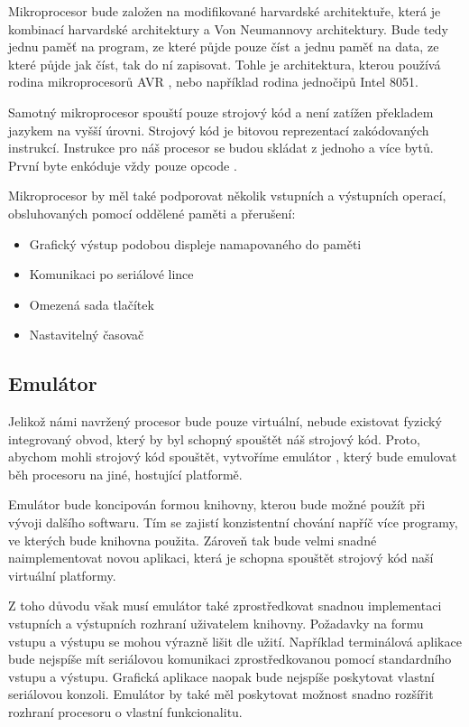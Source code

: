 Mikroprocesor bude založen na modifikované harvardské architektuře, která je kombinací harvardské architektury a Von Neumannovy architektury.  Bude tedy jednu paměť na program, ze které půjde pouze číst a jednu paměť na data, ze které půjde jak číst, tak do ní zapisovat. Tohle je architektura, kterou používá rodina mikroprocesorů AVR , nebo například rodina jednočipů Intel 8051. 

Samotný mikroprocesor spouští pouze strojový kód a není zatížen překladem jazykem na vyšší úrovni. Strojový kód je bitovou reprezentací zakódovaných instrukcí. Instrukce pro náš procesor se budou skládat z jednoho a více bytů. První byte enkóduje vždy pouze opcode . 

Mikroprocesor by měl také podporovat několik vstupních a výstupních operací, obsluhovaných pomocí oddělené paměti a přerušení:

\begin{itemize}
	\item Grafický výstup podobou displeje namapovaného do paměti
	\item Komunikaci po seriálové lince
	\item Omezená sada tlačítek
	\item Nastavitelný časovač
\end{itemize}

\subsection{Emulátor}

Jelikož námi navržený procesor bude pouze virtuální, nebude existovat fyzický integrovaný obvod, který by byl schopný spouštět náš strojový kód. Proto, abychom mohli strojový kód spouštět, vytvoříme emulátor , který bude emulovat běh procesoru na jiné, hostující platformě.

Emulátor bude koncipován formou knihovny, kterou bude možné použít při vývoji dalšího softwaru. Tím se zajistí konzistentní chování napříč více programy, ve kterých bude knihovna použita. Zároveň tak bude velmi snadné naimplementovat novou aplikaci, která je schopna spouštět strojový kód naší virtuální platformy.

Z toho důvodu však musí emulátor také zprostředkovat snadnou implementaci vstupních a výstupních rozhraní uživatelem knihovny. Požadavky na formu vstupu a výstupu se mohou výrazně lišit dle užití. Například terminálová aplikace bude nejspíše mít seriálovou komunikaci zprostředkovanou pomocí standardního vstupu a výstupu. Grafická aplikace naopak bude nejspíše poskytovat vlastní seriálovou konzoli. Emulátor by také měl poskytovat možnost snadno rozšířit rozhraní procesoru o vlastní funkcionalitu.

